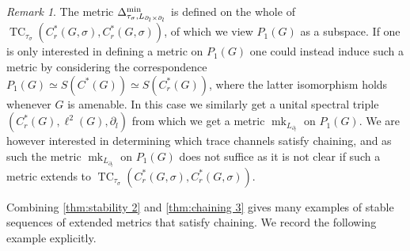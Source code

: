 \documentclass[11pt, a4paper, oneside, final, reqno]{amsart}
\newcommand{\TC}{\operatorname{TC}}
\newcommand{\mk}{\operatorname{mk}}
\newcommand{\Cred}{C^*_r}
\theoremstyle{definition}
\theoremstyle{plain}
\theoremstyle{remark}
\newtheorem{remark}[definition]{Remark}
\numberwithin{equation}{section}
\begin{document}
\begin{remark}
    The metric $\Delta_{\tau_\sigma,L_{\partial_l \times \partial_l}}^{\rm min}$ is defined on the whole of $\TC_{\tau_\sigma}(\Cred(G,\sigma),\Cred(G,\sigma))$, of which we view $P_1(G)$ as a subspace. If one is only interested in defining a metric on $P_1(G)$ one could instead induce such a metric by considering the correspondence $P_1(G) \simeq S(C^*(G)) \simeq S(\Cred(G))$, where the latter isomorphism holds whenever $G$ is amenable. In this case we similarly get a unital spectral triple $(\Cred(G),\ell^2(G),\partial_l)$ from which we get a metric $\mk_{L_{\partial_l}}$ on $P_1(G)$. We are however interested in determining which trace channels satisfy chaining, and as such the metric $\mk_{L_{\partial_l}}$ on $P_1(G)$ does not suffice as it is not clear if such a metric extends to $\TC_{\tau_\sigma}(\Cred(G,\sigma),\Cred(G,\sigma))$. 
\end{remark}

Combining \cref{thm:stability 2} and \cref{thm:chaining 3} gives many examples of stable sequences of extended metrics that satisfy chaining. We record the following example explicitly.
\end{document}
